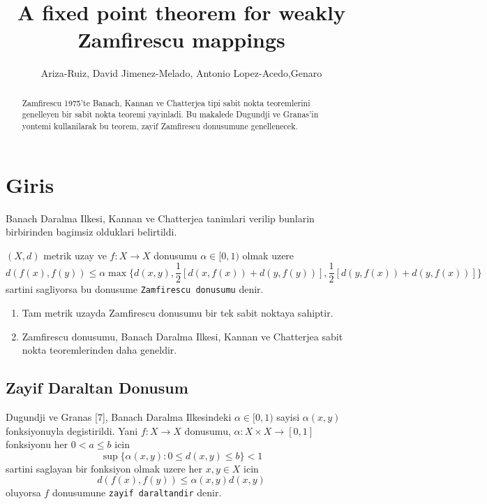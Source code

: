 \documentclass[10pt]{amsart}
\title{A fixed point theorem for weakly Zamfirescu mappings }
\author{Ariza-Ruiz, David Jimenez-Melado, Antonio Lopez-Acedo,Genaro}
\theoremstyle{plain}
\theoremstyle{definition}
\begin{document}
\maketitle

\begin{abstract}
\noindent Zamfirescu 1975'te Banach, Kannan ve Chatterjea tipi sabit nokta teoremlerini genelleyen bir sabit nokta teoremi yayinladi. Bu makalede Dugundji ve Granas'in yontemi kullanilarak bu teorem, zayif Zamfirescu donusumune genellenecek.
\end{abstract}

\section*{Giris}
Banach Daralma Ilkesi, Kannan ve Chatterjea tanimlari verilip bunlarin birbirinden bagimsiz olduklari belirtildi.

 $(X,d)$  metrik uzay ve $f: X \rightarrow X$ donusumu $\alpha \in [0,1)$ olmak uzere 
\begin{equation} 
  d(f(x), f(y))\leq \alpha\max\bigg\{ d(x,y), \frac{1}{2}[d(x,f(x))+d(y,f(y))], \frac{1}{2}[d(y,f(x))+d(y,f(x))] \bigg\} 
\tag*{[Z]}
\end{equation}
sartini sagliyorsa bu donusume \texttt{Zamfirescu donusumu} denir.

\begin{enumerate}
\item  Tam metrik uzayda Zamfirescu donusumu bir tek sabit noktaya sahiptir.
\item  Zamfirescu donusumu, Banach Daralma Ilkesi, Kannan ve Chatterjea sabit nokta teoremlerinden daha geneldir.
\end{enumerate}

\subsection*{Zayif Daraltan Donusum}
  Dugundji ve Granas [7], Banach Daralma Ilkesindeki $\alpha \in [0,1)$ sayisi $\alpha(x,y)$ fonksiyonuyla degistirildi. Yani $f:X \rightarrow X$ donusumu,
 $\alpha :X\times X \rightarrow [0,1]$ fonksiyonu her $0<a\leq b$ icin 
\begin{equation*} 
  \sup\big\{\alpha(x,y) : 0\leq d(x,y) \leq b \big\} < 1
\end{equation*}
sartini saglayan bir fonksiyon olmak uzere her $x,y\in X$ icin
\begin{equation*} 
  d(f(x), f(y))\leq \alpha(x,y)d(x,y) 
\end{equation*}
oluyorsa $f$ donusumune \texttt{zayif daraltandir} denir.
\end{document}
